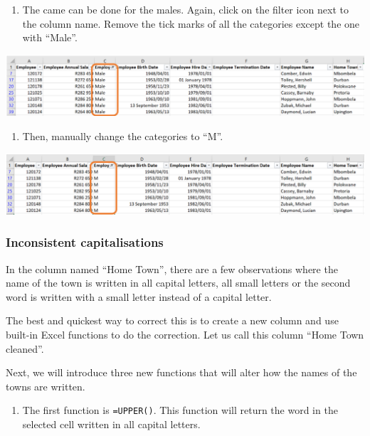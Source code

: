\documentclass[
]{book}
\providecommand{\tightlist}{%
  \setlength{\itemsep}{0pt}\setlength{\parskip}{0pt}}
\begin{document}
\begin{enumerate}
\def\labelenumi{\arabic{enumi}.}
\setcounter{enumi}{4}
\tightlist
\item
  The came can be done for the males. Again, click on the filter icon next to the column name. Remove the tick marks of all the categories except the one with ``Male''.
\end{enumerate}

\begin{center}\includegraphics[width=0.7\linewidth]{Figures/cleaning_categories_5} \end{center}

\begin{enumerate}
\def\labelenumi{\arabic{enumi}.}
\setcounter{enumi}{5}
\tightlist
\item
  Then, manually change the categories to ``M''.
\end{enumerate}

\begin{center}\includegraphics[width=0.7\linewidth]{Figures/cleaning_categories_6} \end{center}

\subsubsection*{Inconsistent capitalisations}\label{inconsistent-capitalisations}

In the column named ``Home Town'', there are a few observations where the name of the town is written in all capital letters, all small letters or the second word is written with a small letter instead of a capital letter.

The best and quickest way to correct this is to create a new column and use built-in Excel functions to do the correction. Let us call this column ``Home Town cleaned''.

Next, we will introduce three new functions that will alter how the names of the towns are written.

\newpage

\begin{enumerate}
\def\labelenumi{\arabic{enumi}.}
\tightlist
\item
  The first function is \texttt{=UPPER()}. This function will return the word in the selected cell written in all capital letters.
\end{enumerate}
\end{document}
